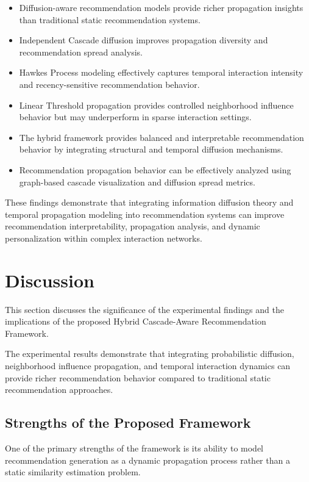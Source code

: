 \documentclass{article}
\begin{document}
\begin{itemize}
\item Diffusion-aware recommendation models provide richer propagation insights than traditional static recommendation systems.
\item Independent Cascade diffusion improves propagation diversity and recommendation spread analysis.
\item Hawkes Process modeling effectively captures temporal interaction intensity and recency-sensitive recommendation behavior.
\item Linear Threshold propagation provides controlled neighborhood influence behavior but may underperform in sparse interaction settings.
\item The hybrid framework provides balanced and interpretable recommendation behavior by integrating structural and temporal diffusion mechanisms.
\item Recommendation propagation behavior can be effectively analyzed using graph-based cascade visualization and diffusion spread metrics.
\end{itemize}

These findings demonstrate that integrating information diffusion theory and temporal propagation modeling into recommendation systems can improve recommendation interpretability, propagation analysis, and dynamic personalization within complex interaction networks.

\section{Discussion}

This section discusses the significance of the experimental findings and the implications of the proposed Hybrid Cascade-Aware Recommendation Framework.

The experimental results demonstrate that integrating probabilistic diffusion, neighborhood influence propagation, and temporal interaction dynamics can provide richer recommendation behavior compared to traditional static recommendation approaches.

\subsection{Strengths of the Proposed Framework}

One of the primary strengths of the framework is its ability to model recommendation generation as a dynamic propagation process rather than a static similarity estimation problem.
\end{document}
